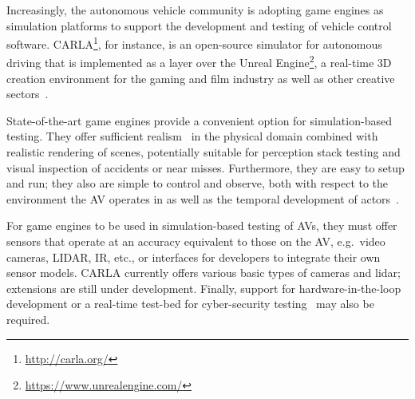 \documentclass[letterpaper, 10 pt, journal, twoside]{IEEEtran}
\begin{document}
Increasingly, the autonomous vehicle community is adopting game engines as simulation platforms to support the development and testing of vehicle control software. 
%
CARLA\footnote{\url{http://carla.org/}}, for instance, is an open-source simulator for autonomous driving that is implemented as a layer over the Unreal Engine\footnote{\url{https://www.unrealengine.com/}}, a  real-time 3D creation environment for the gaming and film industry as well as other creative sectors~\cite{CARLA_paper}. 

State-of-the-art game engines provide a convenient option for simulation-based testing. They offer sufficient realism~\cite{Koopman2018} in the physical domain combined with realistic rendering of scenes, potentially suitable for perception stack testing and visual inspection of accidents or near misses. 
%
Furthermore, they are easy to setup and run; they also are simple to control and observe, both with respect to the environment the AV operates in as well as the temporal development of actors~\cite{Ulbrich2015}. 
%

For game engines to be used in simulation-based testing of AVs, they must offer sensors that operate at an accuracy equivalent to those on the AV, e.g.\ video cameras, LIDAR, IR, etc., or interfaces for developers to integrate their own sensor models. CARLA currently offers various basic types of cameras and %
lidar; extensions are still under development. 
%
Finally, support for hardware-in-the-loop development or a real-time test-bed for cyber-security testing~\cite{Javaid2013} may also be required. %
%
\end{document}
